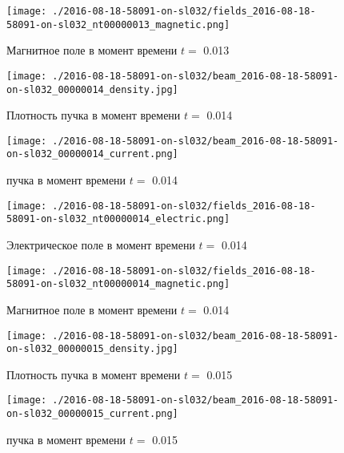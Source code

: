 \documentclass[a4paper,14pt]{extreport}
\begin{document}
\begin{center}
\begin{figure}[!hbt]
\texttt{[image: ./2016-08-18-58091-on-sl032/fields\_2016-08-18-58091-on-sl032\_nt00000013\_magnetic.png]}
\caption{\label{magnetic_13_55} Магнитное поле  в момент времени $t = $ 0.013 }
\end{figure}
\end{center}
\begin{center}
\begin{figure}[!hbt]
\texttt{[image: ./2016-08-18-58091-on-sl032/beam\_2016-08-18-58091-on-sl032\_00000014\_density.jpg]}
\caption{\label{density_beam14_56} Плотность пучка в момент времени $t = $ 0.014 }
\end{figure}
\end{center}
\begin{center}
\begin{figure}[!hbt]
\texttt{[image: ./2016-08-18-58091-on-sl032/beam\_2016-08-18-58091-on-sl032\_00000014\_current.png]}
\caption{\label{current_beam14_57}  пучка в момент времени $t = $ 0.014 }
\end{figure}
\end{center}
\begin{center}
\begin{figure}[!hbt]
\texttt{[image: ./2016-08-18-58091-on-sl032/fields\_2016-08-18-58091-on-sl032\_nt00000014\_electric.png]}
\caption{\label{electric_14_58} Электрическое поле  в момент времени $t = $ 0.014 }
\end{figure}
\end{center}
\begin{center}
\begin{figure}[!hbt]
\texttt{[image: ./2016-08-18-58091-on-sl032/fields\_2016-08-18-58091-on-sl032\_nt00000014\_magnetic.png]}
\caption{\label{magnetic_14_59} Магнитное поле  в момент времени $t = $ 0.014 }
\end{figure}
\end{center}
\begin{center}
\begin{figure}[!hbt]
\texttt{[image: ./2016-08-18-58091-on-sl032/beam\_2016-08-18-58091-on-sl032\_00000015\_density.jpg]}
\caption{\label{density_beam15_60} Плотность пучка в момент времени $t = $ 0.015 }
\end{figure}
\end{center}
\begin{center}
\begin{figure}[!hbt]
\texttt{[image: ./2016-08-18-58091-on-sl032/beam\_2016-08-18-58091-on-sl032\_00000015\_current.png]}
\caption{\label{current_beam15_61}  пучка в момент времени $t = $ 0.015 }
\end{figure}
\end{center}
\end{document}
